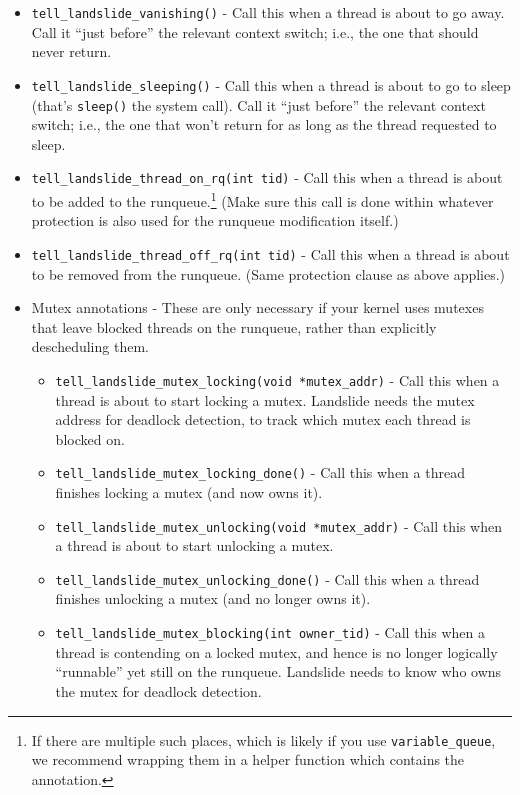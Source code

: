 \documentclass{article}
\begin{document}
\begin{itemize}
		Call it ``just before'' the action which makes the new thread runnable - whether your kernel just adds it to the runqueue (in which case the next annotation called would be \texttt{thread\_on\_rq}) or begins running it immediately (in which case \texttt{thread\_switch}); Landslide handles both cases.\footnote{It may help to think of this as setting a ``currently forking'' state flag in the calling thread: when the next annotation is called, Landslide will see the flag is set and act accordingly. It is okay if interrupts are on between this call and the subsequent event.}
	\item \texttt{tell\_landslide\_vanishing()} - Call this when a thread is about to go away.
		Call it ``just before'' the relevant context switch; i.e., the one that should never return.
	\item \texttt{tell\_landslide\_sleeping()} - Call this when a thread is about to go to sleep (that's \texttt{sleep()} the system call).
		Call it ``just before'' the relevant context switch; i.e., the one that won't return for as long as the thread requested to sleep.
	\item \texttt{tell\_landslide\_thread\_on\_rq(int tid)} - Call this when a thread is about to be added to the runqueue.\footnote{If there are multiple such places, which is likely if you use \texttt{variable\_queue}, we recommend wrapping them in a helper function which contains the annotation.}
		(Make sure this call is done within whatever protection is also used for the runqueue modification itself.)
	\item \texttt{tell\_landslide\_thread\_off\_rq(int tid)} - Call this when a thread is about to be removed from the runqueue. (Same protection clause as above applies.)
	\item Mutex annotations - These are only necessary if your kernel uses mutexes that leave blocked threads on the runqueue, rather than explicitly descheduling them.
	\begin{itemize}
		\item \texttt{tell\_landslide\_mutex\_locking(void *mutex\_addr)} - Call this when a thread is about to start locking a mutex. Landslide needs the mutex address for deadlock detection, to track which mutex each thread is blocked on.
		\item \texttt{tell\_landslide\_mutex\_locking\_done()} - Call this when a thread finishes locking a mutex (and now owns it).
		\item \texttt{tell\_landslide\_mutex\_unlocking(void *mutex\_addr)} - Call this when a thread is about to start unlocking a mutex.
		\item \texttt{tell\_landslide\_mutex\_unlocking\_done()} - Call this when a thread finishes unlocking a mutex (and no longer owns it).
		\item \texttt{tell\_landslide\_mutex\_blocking(int owner\_tid)} - Call this when a thread is contending on a locked mutex, and hence is no longer logically ``runnable'' yet still on the runqueue. Landslide needs to know who owns the mutex for deadlock detection.
	\end{itemize}
\end{itemize}
\end{document}

